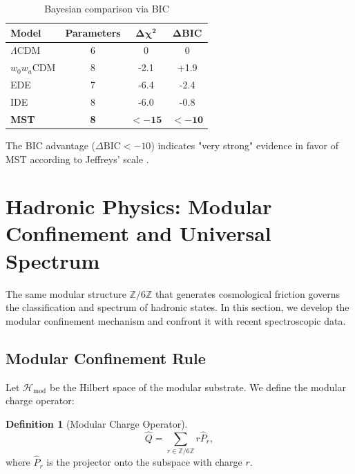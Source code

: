 \documentclass[11pt, a4paper]{article}
\theoremstyle{plain}
\theoremstyle{definition}
\newtheorem{definition}[theorem]{Definition}
\newcommand{\Zmod}{\mathbb{Z}/6\mathbb{Z}}
\newcommand{\Hmod}{\mathcal{H}_{\text{mod}}}
\begin{document}
\begin{table}[H]
\centering
\caption{Bayesian comparison via BIC}
\label{tab:bic_comparison}
\begin{tabular}{lccc}
\toprule
\textbf{Model} & \textbf{Parameters} & $\mathbf{\Delta\chi^2}$ & $\mathbf{\Delta\text{BIC}}$ \\
\midrule
$\Lambda$CDM & 6 & 0 & 0 \\
$w_0w_a$CDM & 8 & -2.1 & +1.9 \\
EDE & 7 & -6.4 & -2.4 \\
IDE & 8 & -6.0 & -0.8 \\
\rowcolor{blue!10}
\textbf{MST} & \textbf{8} & $\mathbf{<-15}$ & $\mathbf{<-10}$ \\
\bottomrule
\end{tabular}
\end{table}

The BIC advantage ($\Delta\text{BIC} < -10$) indicates "very strong" evidence in favor of MST according to Jeffreys' scale \cite{Kass1995}.


\section{Hadronic Physics: Modular Confinement and Universal Spectrum}
\label{sec:hadrons}

The same modular structure $\Zmod$ that generates cosmological friction governs the classification and spectrum of hadronic states. In this section, we develop the modular confinement mechanism and confront it with recent spectroscopic data.

\subsection{Modular Confinement Rule}

Let $\Hmod$ be the Hilbert space of the modular substrate. We define the modular charge operator:

\begin{definition}[Modular Charge Operator]
\begin{equation}
\hat{Q} = \sum_{r \in \Zmod} r \hat{P}_r,
\end{equation}
where $\hat{P}_r$ is the projector onto the subspace with charge $r$.
\end{definition}
\end{document}
